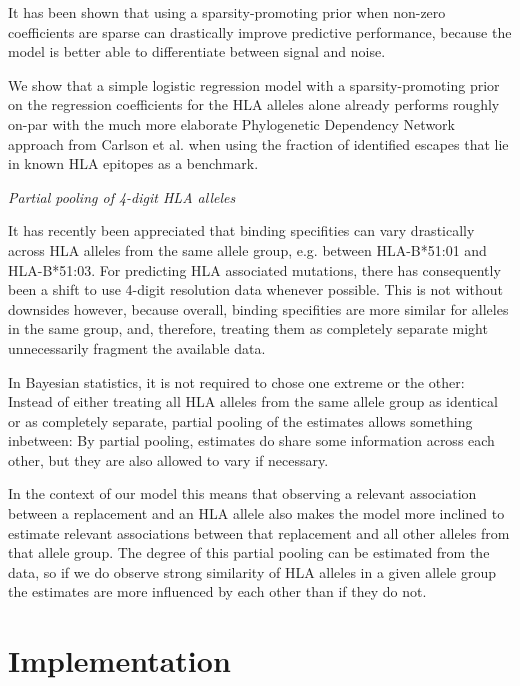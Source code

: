 \documentclass[fleqn,11pt]{SelfArx} %
\begin{document}
  It has been shown that using a sparsity-promoting prior when non-zero coefficients
  are sparse can drastically improve predictive performance, because the model is
  better able to differentiate between signal and noise.

  We show that a simple logistic regression model with a sparsity-promoting prior
  on the regression coefficients for the HLA alleles alone already performs roughly on-par 
  with the much more elaborate Phylogenetic Dependency Network approach from Carlson et al.
  when using the fraction of identified escapes that lie in known HLA epitopes as a
  benchmark.

  \textit{Partial pooling of 4-digit HLA alleles}
  
  It has recently been appreciated that binding specifities can vary drastically across 
  HLA alleles from the same allele group, e.g. between HLA-B*51:01 and HLA-B*51:03.
  For predicting HLA associated mutations, there has consequently been a shift to use
  4-digit resolution data whenever possible.
  This is not without downsides however, because overall, binding specifities
  are more similar for alleles in the same group, and, therefore, treating them
  as completely separate might unnecessarily fragment the available data.

  In Bayesian statistics, it is not required to chose one extreme or the other:
  Instead of either treating all HLA alleles from the same allele group as identical or
  as completely separate, partial pooling of the estimates allows something inbetween:
  By partial pooling, estimates do share some information across each other, but they are
  also allowed to vary if necessary.

  In the context of our model this means that observing a relevant association between
  a replacement and an HLA allele also makes the model more inclined to estimate
  relevant associations between that replacement and all other alleles from that allele group.
  The degree of this partial pooling can be estimated from the data, so if we do observe
  strong similarity of HLA alleles in a given allele group the estimates are more
  influenced by each other than if they do not.

\section{Implementation}
\end{document}
